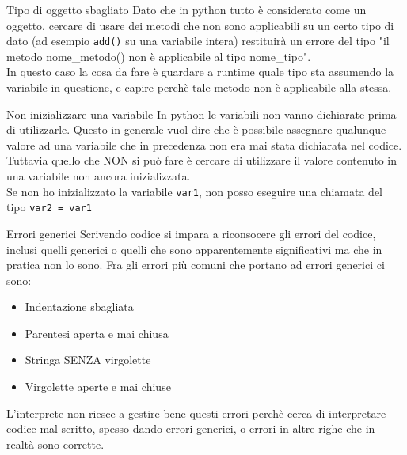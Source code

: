 \documentclass[10pt]{extarticle}
\newcommand{\<}{\langle}
\renewcommand{\>}{\rangle}
\theoremstyle{mystyle}{\newtheorem*{remark}{Nota}}
\theoremstyle{mystyle}{\newtheorem*{remarks}{Note}}
\theoremstyle{mystyle}{\newtheorem*{example}{Esempio}}
\theoremstyle{mystyle}{\newtheorem*{examples}{Esempi}}
\theoremstyle{definition}{\newtheorem*{exercise}{Exercise}}
\theoremstyle{warn}
\begin{document}
\begin{flagbox}[orange]{Tipo di oggetto sbagliato}
Dato che in python tutto è considerato come un oggetto, cercare di usare dei metodi che non sono applicabili su un certo tipo di dato (ad esempio \texttt{add()} su una variabile intera) restituirà un errore del tipo "il metodo nome\_metodo() non è applicabile al tipo nome\_tipo".\\
In questo caso la cosa da fare è guardare a runtime quale tipo sta assumendo la variabile in questione, e capire perchè tale metodo non è applicabile alla stessa.
\end{flagbox}

\begin{flagbox}[orange]{Non inizializzare una variabile}
In python le variabili non vanno dichiarate prima di utilizzarle. Questo in generale vuol dire che è possibile assegnare qualunque valore ad una variabile che in precedenza non era mai stata dichiarata nel codice.\\
Tuttavia quello che NON si può fare è cercare di utilizzare il valore contenuto in una variabile non ancora inizializzata.\\
Se non ho inizializzato la variabile \texttt{var1}, non posso eseguire una chiamata del tipo \texttt{var2 = var1}
\end{flagbox}

\begin{flagbox}[orange]{Errori generici}
Scrivendo codice si impara a riconsocere gli errori del codice, inclusi quelli generici o quelli che sono apparentemente significativi ma che in pratica non lo sono. Fra gli errori più comuni che portano ad errori generici ci sono:
\begin{itemize}
    \item Indentazione sbagliata
    \item Parentesi aperta e mai chiusa
    \item Stringa SENZA virgolette
    \item Virgolette aperte e mai chiuse
\end{itemize}
L'interprete non riesce a gestire bene questi errori perchè cerca di interpretare codice mal scritto, spesso dando errori generici, o errori in altre righe che in realtà sono corrette.
\end{flagbox}
\end{document}
